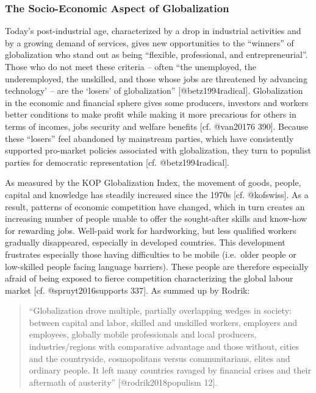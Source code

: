 \documentclass[]{article}
\begin{document}
\subsubsection*{The Socio-Economic Aspect of
Globalization}\label{the-socio-economic-aspect-of-globalization}

Today's post-industrial age, characterized by a drop in industrial
activities and by a growing demand of services, gives new opportunities
to the ``winners'' of globalization who stand out as being ``flexible,
professional, and entrepreneurial''. Those who do not meet these
criteria -- often ``the unemployed, the underemployed, the unskilled,
and those whose jobs are threatened by advancing technology' -- are the
`losers' of globalization'' {[}@betz1994radical{]}. Globalization in the
economic and financial sphere gives some producers, investors and
workers better conditions to make profit while making it more precarious
for others in terms of incomes, jobs security and welfare benefits
{[}cf. @van20176 390{]}. Because these ``losers'' feel abandoned by
mainstream parties, which have consistently supported pro-market
policies associated with globalization, they turn to populist parties
for democratic representation {[}cf. @betz1994radical{]}.

As measured by the KOP Globalization Index, the movement of goods,
people, capital and knowledge has steadily increased since the 1970s
{[}cf. @kofswiss{]}. As a result, patterns of economic competition have
changed, which in turn creates an increasing number of people unable to
offer the sought-after skills and know-how for rewarding jobs. Well-paid
work for hardworking, but less qualified workers gradually disappeared,
especially in developed countries. This development frustrates
especially those having difficulties to be mobile (i.e.~older people or
low-skilled people facing language barriers). These people are therefore
especially afraid of being exposed to fierce competition characterizing
the global labour market {[}cf. @spruyt2016supports 337{]}. As summed up
by Rodrik:

\begin{quote}
``Globalization drove multiple, partially overlapping wedges in society:
between capital and labor, skilled and unskilled workers, employers and
employees, globally mobile professionals and local producers,
industries/regions with comparative advantage and those without, cities
and the countryside, cosmopolitans versus communitarians, elites and
ordinary people. It left many countries ravaged by financial crises and
their aftermath of austerity'' {[}@rodrik2018populism 12{]}.
\end{quote}
\end{document}
